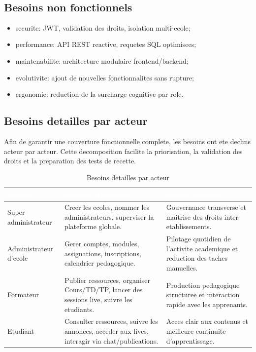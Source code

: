 ﻿﻿\documentclass[12pt,a4paper,oneside]{report}
\begin{document}
\subsection{Besoins non fonctionnels}

\begin{itemize}
  \item securite: JWT, validation des droits, isolation multi-ecole;
  \item performance: API REST reactive, requetes SQL optimisees;
  \item maintenabilite: architecture modulaire frontend/backend;
  \item evolutivite: ajout de nouvelles fonctionnalites sans rupture;
  \item ergonomie: reduction de la surcharge cognitive par role.
\end{itemize}

\subsection{Besoins detailles par acteur}

Afin de garantir une couverture fonctionnelle complete, les besoins ont ete declins acteur par acteur. Cette decomposition facilite la priorisation, la validation des droits et la preparation des tests de recette.

\renewcommand{\arraystretch}{1.35}
\begin{longtable}{|p{2.8cm}|p{4.6cm}|p{4.6cm}|}
\caption{Besoins detailles par acteur}\label{tab:besoins_acteurs}\\
\hline
\rowcolor{ustoblue}
\textcolor{white}{\textbf{Acteur}} &
\textcolor{white}{\textbf{Besoins prioritaires}} &
\textcolor{white}{\textbf{Valeur attendue}} \\
\hline
Super administrateur &
Creer les ecoles, nommer les administrateurs, superviser la plateforme globale. &
Gouvernance transverse et maitrise des droits inter-etablissements. \\
\hline
Administrateur d'ecole &
Gerer comptes, modules, assignations, inscriptions, calendrier pedagogique. &
Pilotage quotidien de l'activite academique et reduction des taches manuelles. \\
\hline
Formateur &
Publier ressources, organiser Cours/TD/TP, lancer des sessions live, suivre les etudiants. &
Production pedagogique structuree et interaction rapide avec les apprenants. \\
\hline
Etudiant &
Consulter ressources, suivre les annonces, acceder aux lives, interagir via chat/publications. &
Acces clair aux contenus et meilleure continuite d'apprentissage. \\
\hline
\end{longtable}
\end{document}
